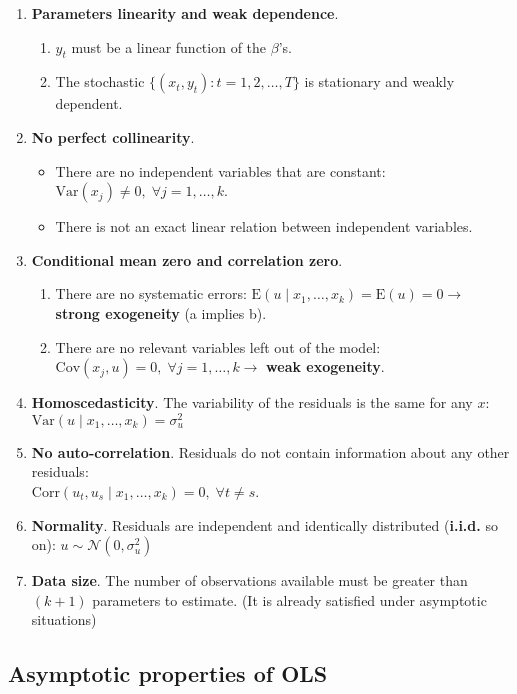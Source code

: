 \documentclass[10pt, a4paper, landscape]{extarticle}
\newcommand{\E}{\mathrm{E}}
\newcommand{\Var}{\mathrm{Var}}
\newcommand{\Cov}{\mathrm{Cov}}
\newcommand{\Corr}{\mathrm{Corr}}
\begin{document}
\begin{multicols}{3}
\begin{enumerate}[leftmargin=*, label=t\arabic*.]
	\item \textbf{Parameters linearity and weak dependence}.
	\begin{enumerate}[leftmargin=*, label=\alph*.]
		\item $y_t$ must be a linear function of the $\beta$'s.
		\item The stochastic $\lbrace(x_t, y_t) : t = 1, 2, \ldots, T\rbrace$ is stationary and weakly dependent.
	\end{enumerate}
	\item \textbf{No perfect collinearity}.
	\begin{itemize}[leftmargin=*]
		\item There are no independent variables that are constant: $\Var(x_j) \neq 0, \; \forall j = 1, \ldots, k$.
		\item There is not an exact linear relation between independent variables.
	\end{itemize}
	\item \textbf{Conditional mean zero and correlation zero}.
	\begin{enumerate}[leftmargin=*, label=\alph*.]
		\item There are no systematic errors: $\E(u \mid x_1, \ldots, x_k) = \E(u) = 0 \rightarrow$ \textbf{strong exogeneity} (a implies b).
		\item There are no relevant variables left out of the model: $\Cov(x_j , u) = 0, \; \forall j = 1, \ldots, k \rightarrow$ \textbf{weak exogeneity}.
	\end{enumerate}
	\item \textbf{Homoscedasticity}. The variability of the residuals is the same for any $x$: $\Var(u \mid x_1, \ldots, x_k) = \sigma^2_u$
	\item \textbf{No auto-correlation}. Residuals do not contain information about any other residuals: \\ $\Corr(u_t, u_s \mid x_1, \ldots, x_k) = 0, \; \forall t \neq s$.
	\item \textbf{Normality}. Residuals are independent and identically distributed (\textbf{i.i.d.} so on): $u \sim \mathcal{N}(0, \sigma^2_u)$
	\item \textbf{Data size}. The number of observations available must be greater than $(k + 1)$ parameters to estimate. (It is already satisfied under asymptotic situations)
\end{enumerate}

\subsection*{Asymptotic properties of OLS}


\end{multicols}
\end{document}
